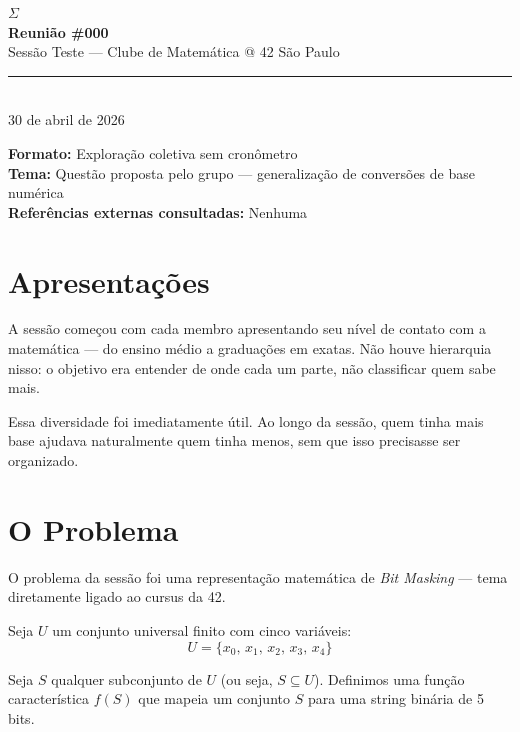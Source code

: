 \documentclass[12pt, a4paper]{article}
\begin{document}
\thispagestyle{empty}

\begin{center}
  \vspace*{2cm}
  {\fontsize{48}{48}\selectfont\color{azul42}$\Sigma$}\\[0.6cm]
  {\fontsize{26}{30}\selectfont\color{azul42}\textbf{Reunião \#000}}\\[0.3cm]
  {\fontsize{14}{18}\selectfont\color{cinza}Sessão Teste --- Clube de Matemática @ 42 São Paulo}\\[0.8cm]
  {\color{azul42}\rule{0.5\textwidth}{1pt}}\\[0.6cm]
  {\normalsize\color{cinza}30 de abril de 2026}
\end{center}

\vspace{1.5cm}

\begin{infobox}
  \textbf{Formato:} Exploração coletiva sem cronômetro\\
  \textbf{Tema:} Questão proposta pelo grupo --- generalização de conversões de base numérica\\
  \textbf{Referências externas consultadas:} Nenhuma
\end{infobox}

\newpage

\section{Apresentações}

A sessão começou com cada membro apresentando seu nível de contato com a matemática --- do ensino médio a graduações em exatas. Não houve hierarquia nisso: o objetivo era entender de onde cada um parte, não classificar quem sabe mais.

Essa diversidade foi imediatamente útil. Ao longo da sessão, quem tinha mais base ajudava naturalmente quem tinha menos, sem que isso precisasse ser organizado.

\section{O Problema}

O problema da sessão foi uma representação matemática de \textit{Bit Masking} --- tema diretamente ligado ao cursus da 42.

Seja $U$ um conjunto universal finito com cinco variáveis:
$$U = \{x_0,\, x_1,\, x_2,\, x_3,\, x_4\}$$

Seja $S$ qualquer subconjunto de $U$ (ou seja, $S \subseteq U$). Definimos uma função característica $f(S)$ que mapeia um conjunto $S$ para uma string binária de 5 bits.
\end{document}

